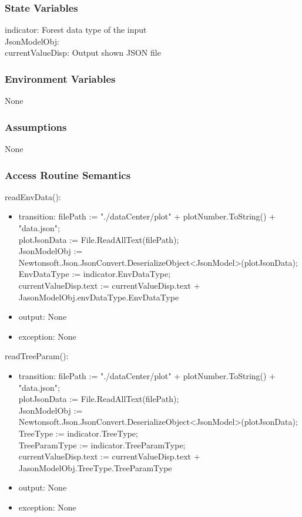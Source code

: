 \documentclass[12pt, titlepage]{article}
\begin{document}
\subsubsection{State Variables}
indicator: Forest data type of the input\\
JsonModelObj: \\
currentValueDisp: Output shown
JSON file\\

\subsubsection{Environment Variables}
None
\subsubsection{Assumptions}
None
\subsubsection{Access Routine Semantics}

\noindent readEnvData():
\begin{itemize}
\item transition: filePath := "./dataCenter/plot" + plotNumber.ToString() + "data.json";\\
plotJsonData := File.ReadAllText(filePath);\\
JsonModelObj := Newtonsoft.Json.JsonConvert.DeserializeObject<JsonModel>(plotJsonData);\\
EnvDataType := indicator.EnvDataType;\\
currentValueDisp.text := currentValueDisp.text + JasonModelObj.envDataType.EnvDataType\\
\item output: None
\item exception: None
\end{itemize}

\noindent readTreeParam():
\begin{itemize}
\item transition: filePath := "./dataCenter/plot" + plotNumber.ToString() + "data.json";\\
plotJsonData := File.ReadAllText(filePath);\\
JsonModelObj := Newtonsoft.Json.JsonConvert.DeserializeObject<JsonModel>(plotJsonData);\\
TreeType := indicator.TreeType;\\
TreeParamType := indicator.TreeParamType;\\
currentValueDisp.text := currentValueDisp.text + JasonModelObj.TreeType.TreeParamType\\
\item output: None
\item exception: None
\end{itemize}
\end{document}
